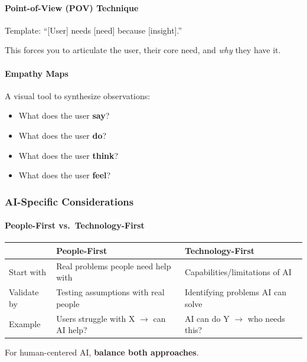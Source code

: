 \paragraph*{Point-of-View (POV) Technique}
Template: ``[User] needs [need] because [insight].''

This forces you to articulate the user, their core need, and \textit{why} they have it.

\paragraph*{Empathy Maps}
A visual tool to synthesize observations:
\begin{itemize}
  \item What does the user \textbf{say}?
  \item What does the user \textbf{do}?
  \item What does the user \textbf{think}?
  \item What does the user \textbf{feel}?
\end{itemize}

\subsubsection*{AI-Specific Considerations}

\paragraph*{People-First vs.\ Technology-First}

\begin{center}
\renewcommand{\arraystretch}{1.3}
\begin{tabular}{@{} l p{5cm} p{5cm} @{}}
\toprule
& \textbf{People-First} & \textbf{Technology-First} \\
\midrule
Start with & Real problems people need help with & Capabilities/limitations of AI \\
Validate by & Testing assumptions with real people & Identifying problems AI can solve \\
Example & Users struggle with X $\to$ can AI help? & AI can do Y $\to$ who needs this? \\
\bottomrule
\end{tabular}
\end{center}

For human-centered AI, \textbf{balance both approaches}.

